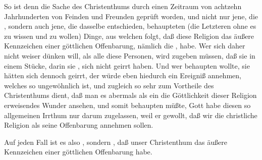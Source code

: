 So ist denn die Sache des Christenthums durch einen Zeitraum von achtzehn Jahrhunderten von Feinden und Freunden geprüft worden, und nicht nur jene, die , sondern auch jene, die  dasselbe entschieden, behaupteten (die Letzteren ohne es zu wissen und zu wollen) Dinge, aus welchen folgt, daß diese Religion das äußere Kennzeichen einer göttlichen Offenbarung, nämlich die , habe. Wer sich daher nicht weiser dünken will, als alle diese Personen, wird zugeben müssen, daß sie in einem Stücke, darin sie , sich nicht geirrt haben. Und wer behaupten wollte, sie hätten sich dennoch geirrt, der würde eben hiedurch ein Ereigniß annehmen, welches so ungewöhnlich ist, und zugleich so sehr zum Vortheile des Christenthums dient, daß man es abermals als ein die Göttlichkeit dieser Religion erweisendes Wunder ansehen, und somit behaupten müßte, Gott habe diesen so allgemeinen Irrthum nur darum zugelassen, weil er gewollt, daß wir die christliche Religion als seine Offenbarung annehmen sollen.\par
Auf jeden Fall ist es also , sondern , daß unser Christenthum das äußere Kennzeichen einer göttlichen Offenbarung habe.



